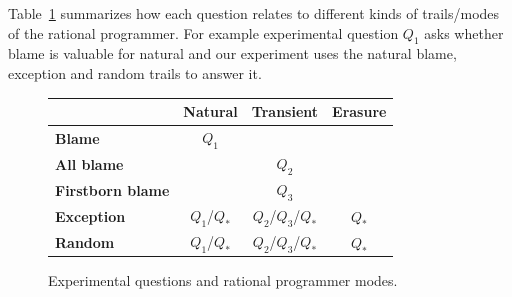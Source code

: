 Table~\ref{fig:experiment-outline} summarizes how each question relates to
different kinds of trails/modes of the rational programmer. For example experimental
question $Q_1$ asks whether blame is valuable for natural and our experiment
uses the natural blame, exception and random trails to answer it.

\begin{figure}[ht]
\center
{\begin{tabular}{l|c|c|c}
                        & {\bf Natural}        & {\bf Transient}          & {\bf Erasure} \\ \hline 
{\bf Blame}             &       $Q_1$          &                          &               \\
{\bf All blame}         &                      &     $Q_2$                &               \\
{\bf Firstborn blame}   &                      &     $Q_3$                &               \\
{\bf Exception}         &       $Q_1$/$Q_*$    &     $Q_2$/$Q_3$/$Q_*$    &      $Q_*$    \\
{\bf Random}            &       $Q_1$/$Q_*$    &     $Q_2$/$Q_3$/$Q_*$    &      $Q_*$    \\
\end{tabular}}
  \caption{ Experimental questions and rational programmer modes.}
  \label{fig:experiment-outline}
\end{figure}


